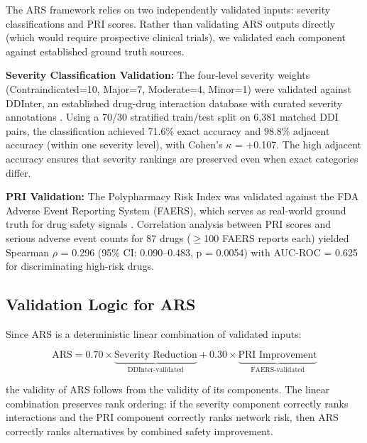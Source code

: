 \documentclass[11pt,a4paper]{article}
\begin{document}
The ARS framework relies on two independently validated inputs: severity classifications and PRI scores. Rather than validating ARS outputs directly (which would require prospective clinical trials), we validated each component against established ground truth sources.

\textbf{Severity Classification Validation:} The four-level severity weights (Contraindicated=10, Major=7, Moderate=4, Minor=1) were validated against DDInter, an established drug-drug interaction database with curated severity annotations \cite{xiong2022ddinter}. Using a 70/30 stratified train/test split on 6,381 matched DDI pairs, the classification achieved 71.6\% exact accuracy and 98.8\% adjacent accuracy (within one severity level), with Cohen's $\kappa$ = +0.107. The high adjacent accuracy ensures that severity rankings are preserved even when exact categories differ.

\textbf{PRI Validation:} The Polypharmacy Risk Index was validated against the FDA Adverse Event Reporting System (FAERS), which serves as real-world ground truth for drug safety signals \cite{faers}. Correlation analysis between PRI scores and serious adverse event counts for 87 drugs ($\geq$100 FAERS reports each) yielded Spearman $\rho$ = 0.296 (95\% CI: 0.090--0.483, p = 0.0054) with AUC-ROC = 0.625 for discriminating high-risk drugs.

\subsection{Validation Logic for ARS}

Since ARS is a deterministic linear combination of validated inputs:

\begin{equation}
\text{ARS} = 0.70 \times \underbrace{\text{Severity Reduction}}_{\text{DDInter-validated}} + 0.30 \times \underbrace{\text{PRI Improvement}}_{\text{FAERS-validated}}
\end{equation}

the validity of ARS follows from the validity of its components. The linear combination preserves rank ordering: if the severity component correctly ranks interactions and the PRI component correctly ranks network risk, then ARS correctly ranks alternatives by combined safety improvement.

\newpage

\end{document}
